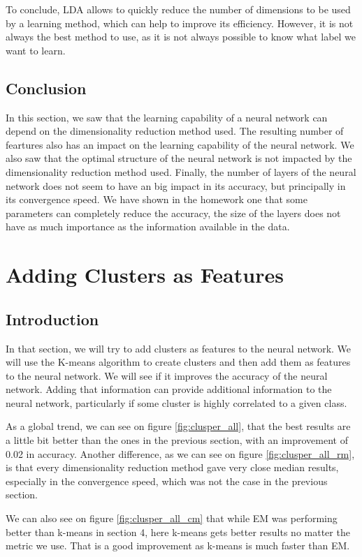 \documentclass[twocolumn, 10pt]{article}
\begin{document}
			To conclude, LDA allows to quickly reduce the number of dimensions to be used by a learning method, which can help to improve its efficiency. However, it is not always the best method to use, as it is not always possible to know what label we want to learn.
		\subsection{Conclusion}
			In this section, we saw that the learning capability of a neural network can depend on the dimensionality reduction method used. The resulting number of feartures also has an impact on the learning capability of the neural network. We also saw that the optimal structure of the neural network is not impacted by the dimensionality reduction method used. Finally, the number of layers of the neural network does not seem to have an big impact in its accuracy, but principally in its convergence speed. We have shown in the homework one that some parameters can completely reduce the accuracy, the size of the layers does not have as much importance as the information available in the data.
	\section{Adding Clusters as Features}
		\subsection{Introduction}
			In that section, we will try to add clusters as features to the neural network. We will use the K-means algorithm to create clusters and then add them as features to the neural network. We will see if it improves the accuracy of the neural network. Adding that information can provide additional information to the neural network, particularly if some cluster is highly correlated to a given class.

			As a global trend, we can see on figure \ref{fig:clusper_all}, that the best results are a little bit better than the ones in the previous section, with an improvement of 0.02 in accuracy. Another difference, as we can see on figure \ref{fig:clusper_all_rm}, is that every dimensionality reduction method gave very close median results, especially in the convergence speed, which was not the case in the previous section.

			We can also see on figure \ref{fig:clusper_all_cm} that while EM was performing better than k-means in section 4, here k-means gets better results no matter the metric we use. That is a good improvement as k-means is much faster than EM.
\end{document}
